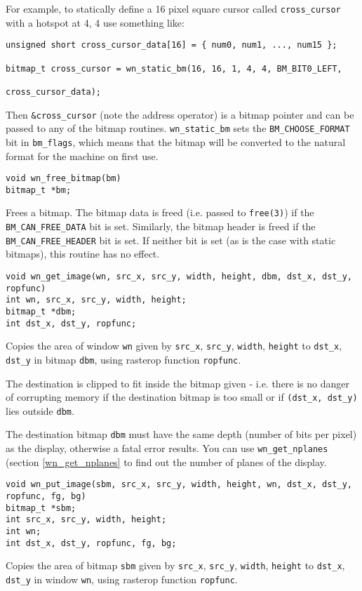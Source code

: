 For example, to statically define a 16 pixel square cursor called
{\tt cross\_cursor} with a hotspot at 4, 4 use something like:
\begin{verbatim}
unsigned short cross_cursor_data[16] = { num0, num1, ..., num15 };

bitmap_t cross_cursor = wn_static_bm(16, 16, 1, 4, 4, BM_BIT0_LEFT,
                                                        cross_cursor_data);
\end{verbatim}
Then {\tt \&cross\_cursor} (note the address operator) is a bitmap pointer
and can be passed to any of the bitmap routines.
{\tt wn\_static\_bm} sets the {\tt BM\_CHOOSE\_FORMAT} bit in {\tt bm\_flags},
which means that the bitmap will be converted to the natural format for the
machine on first use.
\begin{verbatim}
void wn_free_bitmap(bm)
bitmap_t *bm;
\end{verbatim}
Frees a bitmap.
The bitmap data is freed (i.e. passed to {\tt free(3)}) if the
{\tt BM\_CAN\_FREE\_DATA} bit is set.
Similarly, the bitmap header is freed if the {\tt BM\_CAN\_FREE\_HEADER} bit is set.
If neither bit is set (as is the case with static bitmaps), this routine
has no effect.
\begin{verbatim}
void wn_get_image(wn, src_x, src_y, width, height, dbm, dst_x, dst_y, ropfunc)
int wn, src_x, src_y, width, height;
bitmap_t *dbm;
int dst_x, dst_y, ropfunc;
\end{verbatim}
Copies the area of window {\tt wn} given by {\tt src\_x}, {\tt src\_y},
{\tt width}, {\tt height} to {\tt dst\_x}, {\tt dst\_y} in bitmap {\tt dbm},
using rasterop function {\tt ropfunc}.

The destination is clipped to fit inside the bitmap given - i.e. there
is no danger of corrupting memory if the destination bitmap is too small or
if {\tt (dst\_x, dst\_y)} lies outside {\tt dbm}.

The destination bitmap {\tt dbm} must have the same depth (number of bits
per pixel) as the display, otherwise a fatal error results.
You can use {\tt wn\_get\_nplanes} (section \ref{wn_get_nplanes}
to find out the number of planes of the display.
\begin{verbatim}
void wn_put_image(sbm, src_x, src_y, width, height, wn, dst_x, dst_y, ropfunc, fg, bg)
bitmap_t *sbm;
int src_x, src_y, width, height;
int wn;
int dst_x, dst_y, ropfunc, fg, bg;
\end{verbatim}
Copies the area of bitmap {\tt sbm} given by {\tt src\_x}, {\tt src\_y},
{\tt width}, {\tt height} to {\tt dst\_x}, {\tt dst\_y} in window {\tt wn},
using rasterop function {\tt ropfunc}.

